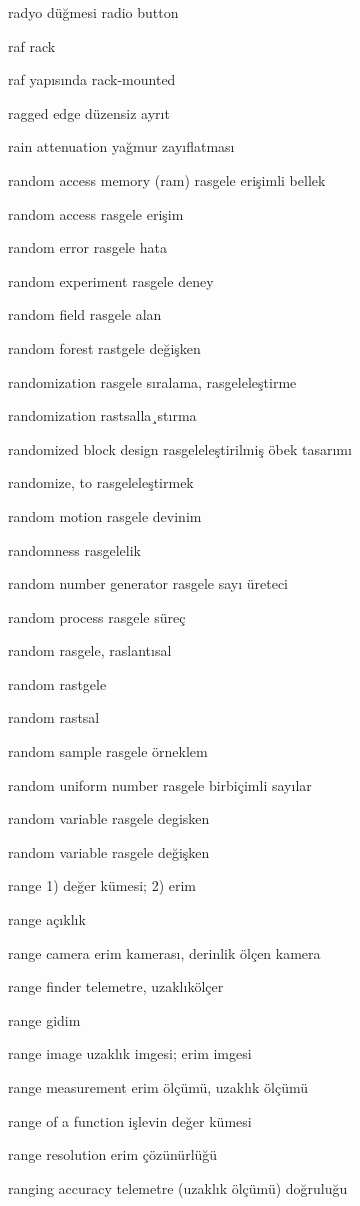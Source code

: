 \documentclass[12pt,fleqn]{article}\usepackage{../../common}
\begin{document}
radyo düğmesi radio button

raf rack

raf yapısında rack-mounted

ragged edge düzensiz ayrıt

rain attenuation yağmur zayıflatması

random access memory (ram) rasgele erişimli bellek

random access rasgele erişim

random error rasgele hata

random experiment rasgele deney

random field rasgele alan

random forest rastgele değişken

randomization rasgele sıralama, rasgeleleştirme

randomization rastsalla¸stırma

randomized block design rasgeleleştirilmiş öbek tasarımı

randomize, to rasgeleleştirmek

random motion rasgele devinim

randomness rasgelelik

random number generator rasgele sayı üreteci

random process rasgele süreç

random rasgele, raslantısal

random rastgele

random rastsal

random sample rasgele örneklem

random uniform number rasgele birbiçimli sayılar

random variable rasgele degisken

random variable rasgele değişken

range 1) değer kümesi; 2) erim

range açıklık

range camera erim kamerası, derinlik ölçen kamera

range finder telemetre, uzaklıkölçer

range gidim

range image uzaklık imgesi; erim imgesi

range measurement erim ölçümü, uzaklık ölçümü

range of a function işlevin değer kümesi

range resolution erim çözünürlüğü

ranging accuracy telemetre (uzaklık ölçümü) doğruluğu
\end{document}
